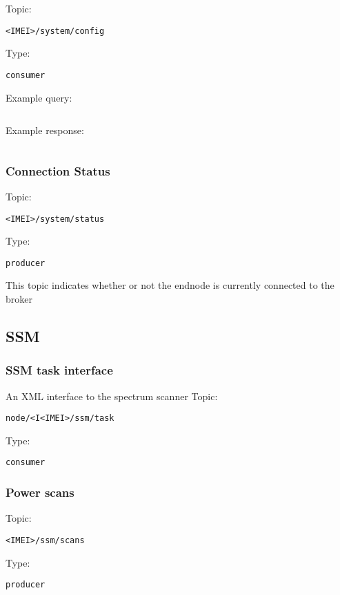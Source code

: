 Topic:
\begin{lstlisting}<IMEI>/system/config\end{lstlisting}
Type:
\begin{lstlisting}consumer\end{lstlisting}
Example query:
\begin{lstlisting}\end{lstlisting}
Example response:
\begin{lstlisting}\end{lstlisting}

\subsubsection{Connection Status}

Topic:
\begin{lstlisting}<IMEI>/system/status\end{lstlisting}
Type:
\begin{lstlisting}producer\end{lstlisting}
    
This topic indicates whether or not the endnode is currently connected to the broker

\subsection{SSM}

\subsubsection{SSM task interface}
An XML interface to the spectrum scanner
Topic:
\begin{lstlisting}node/<I<IMEI>/ssm/task\end{lstlisting}
Type:
\begin{lstlisting}consumer\end{lstlisting}

\subsubsection{Power scans}
Topic:
\begin{lstlisting}<IMEI>/ssm/scans\end{lstlisting}
Type:
\begin{lstlisting}producer\end{lstlisting}
    
